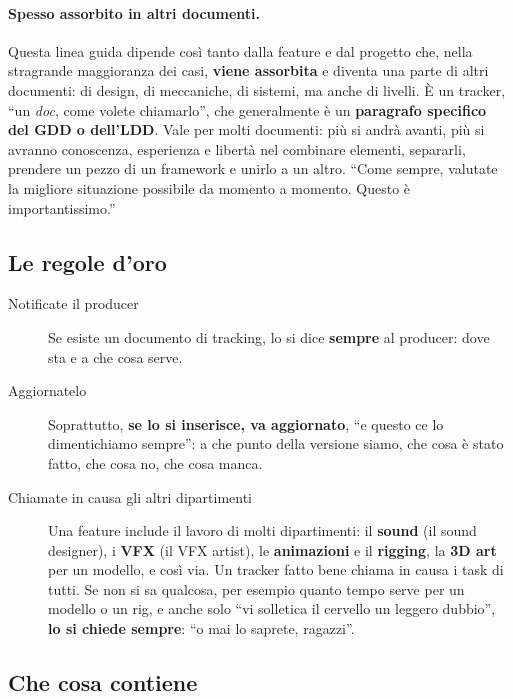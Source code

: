 \paragraph{Spesso assorbito in altri documenti.} Questa linea guida dipende
così tanto dalla feature e dal progetto che, nella stragrande maggioranza dei
casi, \textbf{viene assorbita} e diventa una parte di altri documenti: di
design, di meccaniche, di sistemi, ma anche di livelli. È un tracker, ``un
\emph{doc}, come volete chiamarlo'', che generalmente è un
\textbf{paragrafo specifico del GDD o dell'LDD}. Vale per molti documenti:
più si andrà avanti, più si avranno conoscenza, esperienza e libertà nel
combinare elementi, separarli, prendere un pezzo di un framework e unirlo a
un altro. ``Come sempre, valutate la migliore situazione possibile da
momento a momento. Questo è importantissimo.''

\subsection{Le regole d'oro}

\begin{description}
  \item[Notificate il producer] Se esiste un documento di tracking, lo si
        dice \textbf{sempre} al producer: dove sta e a che cosa serve.
  \item[Aggiornatelo] Soprattutto, \textbf{se lo si inserisce, va
        aggiornato}, ``e questo ce lo dimentichiamo sempre'': a che punto
        della versione siamo, che cosa è stato fatto, che cosa no, che cosa
        manca.
  \item[Chiamate in causa gli altri dipartimenti] Una feature include il
        lavoro di molti dipartimenti: il \textbf{sound} (il sound designer),
        i \textbf{VFX} (il VFX artist), le \textbf{animazioni} e il
        \textbf{rigging}, la \textbf{3D art} per un modello, e così via. Un
        tracker fatto bene chiama in causa i task di tutti. Se non si sa
        qualcosa, per esempio quanto tempo serve per un modello o un
        rig, e anche solo ``vi solletica il cervello un leggero dubbio'',
        \textbf{lo si chiede sempre}: ``o mai lo saprete, ragazzi''.
\end{description}

\subsection{Che cosa contiene}

